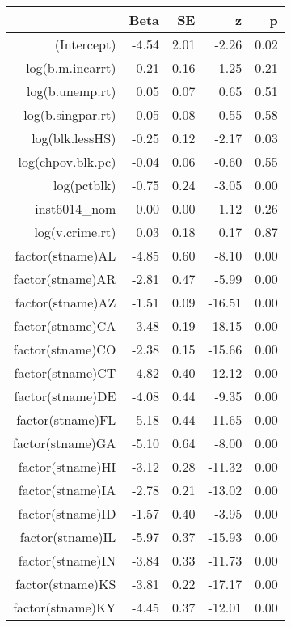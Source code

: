 \begin{table}[ht]
\centering
\begin{tabular}{rrrrr}
  \hline
 & Beta & SE & z & p \\ 
  \hline
(Intercept) & -4.54 & 2.01 & -2.26 & 0.02 \\ 
  log(b.m.incarrt) & -0.21 & 0.16 & -1.25 & 0.21 \\ 
  log(b.unemp.rt) & 0.05 & 0.07 & 0.65 & 0.51 \\ 
  log(b.singpar.rt) & -0.05 & 0.08 & -0.55 & 0.58 \\ 
  log(blk.lessHS) & -0.25 & 0.12 & -2.17 & 0.03 \\ 
  log(chpov.blk.pc) & -0.04 & 0.06 & -0.60 & 0.55 \\ 
  log(pctblk) & -0.75 & 0.24 & -3.05 & 0.00 \\ 
  inst6014\_nom & 0.00 & 0.00 & 1.12 & 0.26 \\ 
  log(v.crime.rt) & 0.03 & 0.18 & 0.17 & 0.87 \\ 
  factor(stname)AL & -4.85 & 0.60 & -8.10 & 0.00 \\ 
  factor(stname)AR & -2.81 & 0.47 & -5.99 & 0.00 \\ 
  factor(stname)AZ & -1.51 & 0.09 & -16.51 & 0.00 \\ 
  factor(stname)CA & -3.48 & 0.19 & -18.15 & 0.00 \\ 
  factor(stname)CO & -2.38 & 0.15 & -15.66 & 0.00 \\ 
  factor(stname)CT & -4.82 & 0.40 & -12.12 & 0.00 \\ 
  factor(stname)DE & -4.08 & 0.44 & -9.35 & 0.00 \\ 
  factor(stname)FL & -5.18 & 0.44 & -11.65 & 0.00 \\ 
  factor(stname)GA & -5.10 & 0.64 & -8.00 & 0.00 \\ 
  factor(stname)HI & -3.12 & 0.28 & -11.32 & 0.00 \\ 
  factor(stname)IA & -2.78 & 0.21 & -13.02 & 0.00 \\ 
  factor(stname)ID & -1.57 & 0.40 & -3.95 & 0.00 \\ 
  factor(stname)IL & -5.97 & 0.37 & -15.93 & 0.00 \\ 
  factor(stname)IN & -3.84 & 0.33 & -11.73 & 0.00 \\ 
  factor(stname)KS & -3.81 & 0.22 & -17.17 & 0.00 \\ 
  factor(stname)KY & -4.45 & 0.37 & -12.01 & 0.00 \\ 

\end{tabular}
\end{table}
